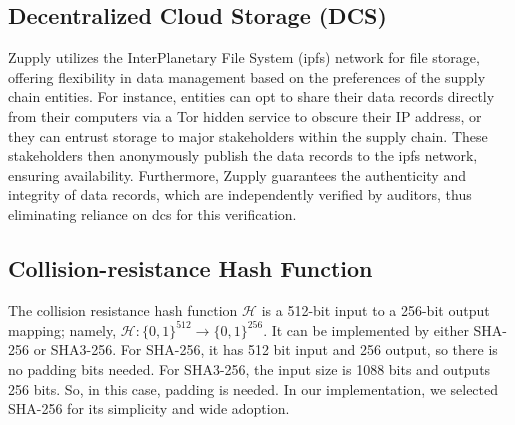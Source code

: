 \subsection{Decentralized Cloud Storage (DCS)}

Zupply utilizes the 
InterPlanetary File System
(\gls{ipfs}) network \cite{ipfs} for file storage, offering flexibility in data management based on the preferences of the supply chain entities. For instance, entities can opt to share their data records directly from their computers via a Tor hidden service \cite{Loshin2013PracticalAnonymity} to obscure their IP address, or they can entrust storage to major stakeholders within the supply chain. These stakeholders then anonymously publish the data records to the \gls{ipfs} network, ensuring availability. Furthermore, Zupply guarantees the authenticity and integrity of data records, which are independently verified by auditors, thus eliminating reliance on \gls{dcs} for this verification. 




 



\subsection{Collision-resistance Hash Function}

The collision resistance hash function $\mathcal{H}$ is a 512-bit input to a 256-bit output mapping; namely, $\mathcal{H}:\{0,1\}^{512} \rightarrow \{0,1\}^{256}$. It can be implemented by either SHA-256 or SHA3-256. For SHA-256, it has 512 bit input and 256 output, so there is no padding bits needed. For SHA3-256, the input size is 1088 bits  and outputs 256 bits. So, in this case, padding is needed. In our implementation, we selected SHA-256 for its simplicity and wide adoption.  

